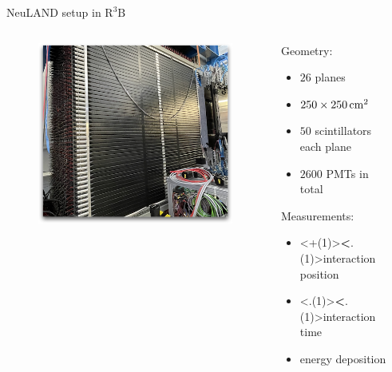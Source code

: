\documentclass[compress, 13pt, aspectratio=169]{beamer}
\begin{document}
{\begin{frame}{NeuLAND setup in $\text{R}^3\text{B}$}
	\begin{columns}[c]
		\begin{column}{0.4\textwidth}
			\pause
			\begin{figure}
				\includegraphics[width = \textwidth]{neulandReal}
			\end{figure}
		\end{column}
		\hspace*{0.5cm}
		\begin{column}{0.3\textwidth}
			\begin{exampleblock}{}
				Geometry:\\
				\begin{itemize}
					\item $26$ planes
					\item $\qtyproduct[product-units=power]{250 x 250}{\centi\meter}$
					\item $50$ scintillators each plane
					\item $2600$ PMTs in total
				\end{itemize}
				\pause
				Measurements:\\
				\begin{itemize}
					\item \alert<+(1)>{\textbf<.(1)>{interaction position}}
					\item \alert<.(1)>{\textbf<.(1)>{interaction time}}
					\item energy deposition
				\end{itemize}
			\end{exampleblock}
		\end{column}
		\begin{column}{0.3\textwidth}
		\end{column}

	\end{columns}
	\let\thefootnote\relax{}
\end{frame}
}
\end{document}
